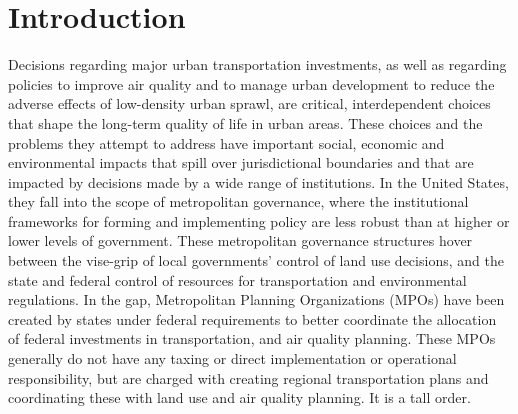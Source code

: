 
\section{Introduction}

Decisions regarding major urban transportation investments, as well as
regarding policies to improve air quality and to manage urban development
to reduce the adverse effects of low-density urban sprawl, are critical,
interdependent choices that shape the long-term quality of life in urban
areas.  These choices and the problems they attempt to address have
important social, economic and environmental impacts that spill over
jurisdictional boundaries and that are impacted by decisions made by a wide
range of institutions.  In the United States, they fall into the scope of
metropolitan governance, where the institutional frameworks for forming and
implementing policy are less robust than at higher or lower levels of
government.  These metropolitan governance structures hover between the
vise-grip of local governments' control of land use decisions, and the
state and federal control of resources for transportation and environmental
regulations.  In the gap, Metropolitan Planning Organizations (MPOs) have
been created by states under federal requirements to better coordinate the
allocation of federal investments in transportation, and air quality
planning.  These MPOs generally do not have any taxing or direct
implementation or operational responsibility, but are charged with creating
regional transportation plans and coordinating these with land use and air
quality planning.  It is a tall order.

